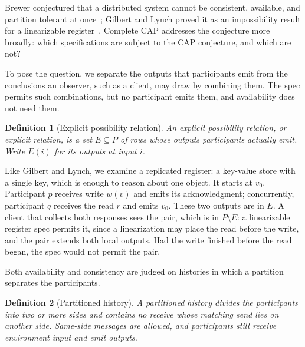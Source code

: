 \documentclass[sigconf]{cidr-2027}
\newtheorem{definition}{Definition}
\theoremstyle{remark}
\newcommand{\outrel}{extends\xspace}          %
\begin{document}
\textcolor{reviewed}{Brewer conjectured that a distributed system cannot be consistent, available,
and partition tolerant at once~\cite{brewer2000towards}; Gilbert and Lynch
proved it as an impossibility result for a linearizable register~\cite{gilbert2002cap}.} \textcolor{reviewed}{Complete CAP addresses the conjecture more broadly:
which specifications are subject to the CAP
conjecture, and which are not?}

\textcolor{reviewed}{To pose the question, we separate the outputs that participants emit from
the conclusions an observer, such as a client, may draw by combining them.} \textcolor{reviewed}{The spec permits such combinations, but no participant emits them, and
availability does not need them.}

\begin{definition}[Explicit possibility relation]
\label{def:explicit-relation}
\textcolor{reviewed}{An \emph{explicit possibility relation}, or \emph{explicit relation}, is a set
$E\subseteq P$ of rows whose outputs participants actually emit.} \textcolor{reviewed}{Write $E(i)$
for its outputs at input $i$.}
\end{definition}

Like Gilbert and Lynch, we examine a replicated register: a key-value store
with a single key, which is enough to reason about one object. It starts at
$v_0$. \textcolor{reviewed}{Participant $p$ receives write $w(v)$ and emits its acknowledgment;
concurrently, participant $q$ receives the read $r$ and emits $v_0$.} \textcolor{reviewed}{These two
outputs are in $E$.} \textcolor{reviewed}{A client that collects both responses sees the pair,
which is in $P\setminus E$: a linearizable register spec permits it, since a
linearization may place the read before the write, and the pair \outrel both local outputs.} Had the write finished before the read began, the
spec would not permit the pair.

\textcolor{reviewed}{Both availability and consistency are judged on histories in which a partition
separates the participants.}

\begin{definition}[Partitioned history]
\label{def:partitioned-history}
\textcolor{reviewed}{A \emph{partitioned history} divides the participants into two or more
sides and contains no receive whose matching send lies on another
side.} \textcolor{reviewed}{Same-side messages are allowed, and participants still receive environment input
and emit outputs.}
\end{definition}
\end{document}
